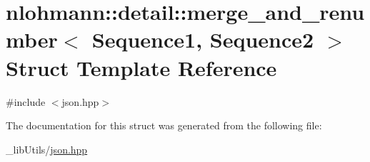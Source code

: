 \hypertarget{structnlohmann_1_1detail_1_1merge__and__renumber}{}\section{nlohmann\+:\+:detail\+:\+:merge\+\_\+and\+\_\+renumber$<$ Sequence1, Sequence2 $>$ Struct Template Reference}
\label{structnlohmann_1_1detail_1_1merge__and__renumber}


{\ttfamily \#include $<$json.\+hpp$>$}



The documentation for this struct was generated from the following file\+:\begin{DoxyCompactItemize}
\item 
\+\_\+lib\+Utils/\hyperlink{json_8hpp}{json.\+hpp}\end{DoxyCompactItemize}
